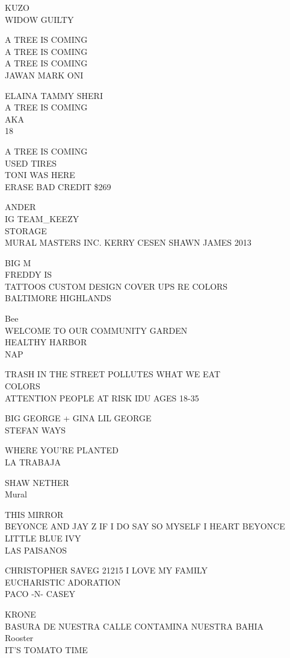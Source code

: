 \documentclass[10pt,letterpaper]{article}
\begin{document}
KUZO\\
WIDOW GUILTY

A TREE IS COMING\\
A TREE IS COMING\\
A TREE IS COMING\\
JAWAN MARK ONI

ELAINA TAMMY SHERI\\
A TREE IS COMING\\
AKA\\
18

A TREE IS COMING\\
USED TIRES\\
TONI WAS HERE\\
ERASE BAD CREDIT \$269

ANDER\\
IG TEAM\_KEEZY\\
STORAGE\\
MURAL MASTERS INC. KERRY CESEN SHAWN JAMES 2013

BIG M\\
FREDDY IS\\
TATTOOS CUSTOM DESIGN COVER UPS RE COLORS\\
BALTIMORE HIGHLANDS

Bee\\
WELCOME TO OUR COMMUNITY GARDEN\\
HEALTHY HARBOR\\
NAP

TRASH IN THE STREET POLLUTES WHAT WE EAT\\
COLORS\\
ATTENTION PEOPLE AT RISK IDU AGES 18{-}35

BIG GEORGE + GINA LIL GEORGE\\
STEFAN WAYS

WHERE YOU'RE PLANTED\\
LA TRABAJA

SHAW NETHER\\
Mural

THIS MIRROR\\
BEYONCE AND JAY Z IF I DO SAY SO MYSELF I HEART BEYONCE LITTLE BLUE IVY\\
LAS PAISANOS

CHRISTOPHER SAVEG 21215 I LOVE MY FAMILY\\
EUCHARISTIC ADORATION\\
PACO {-}N{-} CASEY

KRONE\\
BASURA DE NUESTRA CALLE CONTAMINA NUESTRA BAHIA\\
Rooster\\
IT'S TOMATO TIME
\end{document}
